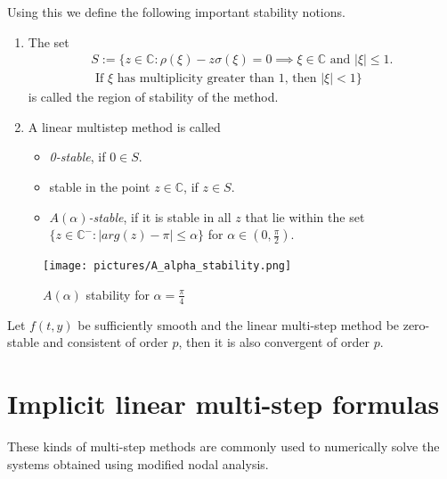 	
	Using this we define the following important stability notions.
	\begin{definition}
		\begin{enumerate}
			\item 
			The set
			\begin{equation}
				\begin{aligned}
					S := \{z \in \mathbb{C} : \rho(\xi) - z \sigma(\xi) = 0 \implies \xi \in \mathbb{C} \text{ and } |\xi| \leq 1. \\
					\text{ If $\xi$ has multiplicity greater than $1$, then } |\xi| < 1\}
				\end{aligned}
			\end{equation}
			is called the region of stability of the method.
			\item 
			A linear multistep method is called
			\begin{itemize}
				\item \emph{0-stable}, if $0 \in S$.
				\item stable in the point $z \in \mathbb{C}$, if $z \in S$.
				\item \emph{$A(\alpha)$-stable}, if it is stable in all $z$ that lie within the set $\{z \in \mathbb{C}^- : |arg(z)-\pi| \leq \alpha\}$ for $\alpha \in (0, \frac{\pi}{2})$.		 
			\end{itemize}
		\end{enumerate}
	\end{definition}
	
	
	\begin{figure}[H]
		\centering
		\texttt{[image: pictures/A\_alpha\_stability.png]}
		\caption{$A(\alpha)$ stability for $\alpha = \frac{\pi}{4}$}
		\label{fig:A of alpha stability}
	\end{figure}
	
	\begin{theorem}
		\label{th: null-stbaility and consistence is convergence}
		Let $f(t,y)$ be sufficiently smooth and the linear multi-step method be zero-stable and consistent of order $p$, then it is also convergent of order $p$.
	\end{theorem}
	
	
\section{Implicit linear multi-step formulas}
These kinds of multi-step methods are commonly used to numerically solve the systems obtained using modified nodal analysis.

